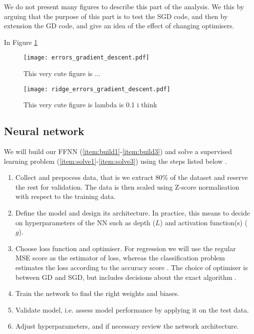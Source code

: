     We do not present many figures to describe this part of the analysis. We  this by arguing that the purpose of this part is to test the SGD code, and then by extension the GD code, and give an idea of the effect of changing optimisers. 

    In Figure \ref{fig:simple_reg_errors_ols}  \fillertext

    \begin{figure}
        \texttt{[image: errors\_gradient\_descent.pdf]}
        \caption{This very cute figure is ...}
        \label{fig:simple_reg_errors_ols}
    \end{figure}

    \begin{figure}
        \texttt{[image: ridge\_errors\_gradient\_descent.pdf]}
        \caption{This very cute figure is  lambda is 0.1 i think}
        \label{fig:simple_reg_errors_ridge}
    \end{figure}




    
\subsection{Neural network}
    We will build our FFNN (\ref{item:build1}-\ref{item:build3}) and solve a supervised learning problem (\ref{item:solve1}-\ref{item:solve3}) using the steps listed below \citep{mhjensen}.

    \begin{enumerate}[label=(\roman*)]
        \item\label{item:build1} Collect and prepocess data, that is we extract 80\% of the dataset and reserve the rest for validation. The data is then scaled using Z-score  normalisation with respect to the training data.
        \item\label{item:build2} Define the model and design its architecture. In practice, this means to decide on hyperparameters of the NN such as depth ($L$) and activation function(s) ($g$).
        \item\label{item:build3} Choose loss function and optimiser. For regression we will use the regular MSE score  as the estimator of loss, whereas the classification problem estimates the loss according to the accuracy score .  The choice of optimiser is between GD and SGD, but includes decisions about the exact algorithm .
        \item\label{item:solve1} Train the network to find the right weights and biases.
        \item\label{item:solve2} Validate model, i.e. assess model performance by applying it on the test data.
        \item\label{item:solve3} Adjust hyperparameters, and if necessary review the network architecture.
    \end{enumerate}

